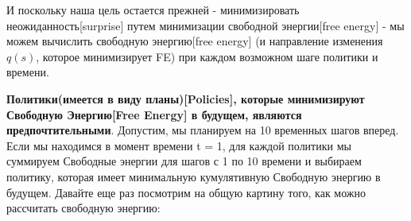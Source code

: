 \documentclass[twoside,leqno, 11pt]{article}
\begin{document}
	\begin{figure}[h]	
		\label{ris:image}
	\end{figure}
	
	И поскольку наша цель остается прежней - минимизировать неожиданность[surprise] путем минимизации свободной энергии[free energy] - мы можем вычислить свободную энергию[free energy] (и направление изменения $q(s)$, которое минимизирует FE) при каждом возможном шаге политики и времени.
	
	\textbf{Политики(имеется в виду планы)[Policies], которые минимизируют Свободную Энергию[Free Energy] в будущем, являются предпочтительными}. Допустим, мы планируем на 10 временных шагов вперед. Если мы находимся в момент времени t = 1, для каждой политики мы суммируем Свободные энергии для шагов с 1 по 10 времени и выбираем политику, которая имеет минимальную кумулятивную Свободную энергию в будущем. Давайте еще раз посмотрим на общую картину того, как можно рассчитать свободную энергию:
	
	\begin{figure}[h]	
		\label{ris:image}
	\end{figure}
	
\end{document}
